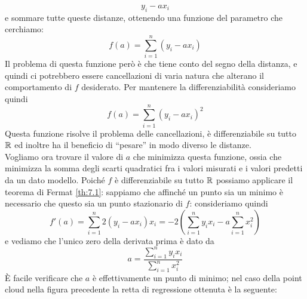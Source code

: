 \[
y_i - ax_i
\]
e sommare tutte queste distanze, ottenendo una funzione del parametro che cerchiamo:
\[
f(a) = \sum_{i=1}^n (y_i-ax_i)
\]
Il problema di questa funzione però è che tiene conto del segno della distanza, e quindi ci potrebbero essere cancellazioni di varia natura che alterano il comportamento di $f$ desiderato. Per mantenere la differenziabilità consideriamo quindi
\[
f(a) = \sum_{i=1}^n(y_i-a x_i)^2
\]
Questa funzione risolve il problema delle cancellazioni, è differenziabile su tutto $\amsbb{R}$ ed inoltre ha il beneficio di ``pesare'' in modo diverso le distanze.\\
Vogliamo ora trovare il valore di $a$ che minimizza questa funzione, ossia che minimizza la somma degli scarti quadratici fra i valori misurati e i valori predetti da un dato modello. Poiché $f$ è differenziabile su tutto $\amsbb{R}$ possiamo applicare il teorema di Fermat \ref{th:7.1}: sappiamo che affinché un punto sia un minimo è necessario che questo sia un punto stazionario di $f$: consideriamo quindi
\[
f'(a) = \sum_{i=1}^n 2(y_i-ax_i)x_i = -2\left(\sum_{i=1}^n y_i x_i -a\sum_{i=1}^n x_i^2\right)
\]
e vediamo che l'unico zero della derivata prima è dato da
\[
a = \frac{\sum_{i=1}^n y_i x_i}{\sum_{i=1}^n x_i^2}
\]
\`E facile verificare che $a$ è effettivamente un punto di minimo; nel caso della point cloud nella figura precedente la retta di regressione ottenuta è la seguente:
\begin{center}
\end{center}

